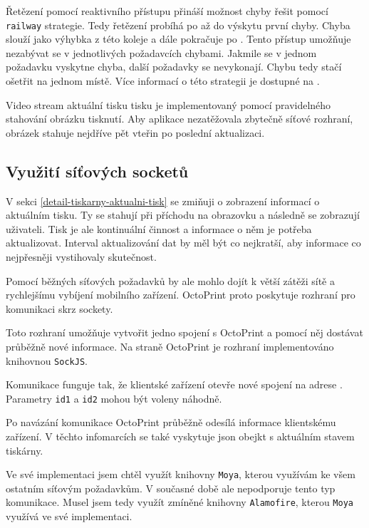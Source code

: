 
Řetězení pomocí reaktivního přístupu přináší možnost chyby řešit pomocí \texttt{railway} strategie.
Tedy řetězení probíhá po  až do výskytu první chyby.
Chyba slouží jako výhybka z této koleje a dále pokračuje po .
Tento přístup umožňuje nezabývat se v jednotlivých požadavcích chybami.
Jakmile se v jednom požadavku vyskytne chyba, další požadavky se nevykonají.
Chybu tedy stačí ošetřit na jednom místě.
Více informací o této strategii je dostupné na \cite{fsharp-railway-strategy}.

Video stream aktuální tisku tisku je implementovaný pomocí pravidelného stahování obrázku tisknutí.
Aby aplikace nezatěžovala zbytečně síťové rozhraní, obrázek stahuje nejdříve pět vteřin po poslední aktualizaci.

\subsection{Využití síťových socketů}

V sekci \ref{detail-tiskarny-aktualni-tisk} se zmiňuji o zobrazení informací o aktuálním tisku.
Ty se stahují při příchodu na obrazovku a následně se zobrazují uživateli.
Tisk je ale kontinuální činnost a informace o něm je potřeba aktualizovat.
Interval aktualizování dat by měl být co nejkratší, aby informace co nejpřesněji vystihovaly skutečnost.

Pomocí běžných síťových požadavků by ale mohlo dojít k větší zátěži sítě a rychlejšímu vybíjení mobilního zařízení.
OctoPrint proto poskytuje rozhraní pro komunikaci skrz sockety.

Toto rozhraní umožňuje vytvořit jedno spojení s OctoPrint a pomocí něj dostávat průběžně nové informace.
Na straně OctoPrint je rozhraní implementováno knihovnou \texttt{SockJS}.

Komunikace funguje tak, že klientské zařízení otevře nové spojení na adrese .
Parametry \texttt{id1} a \texttt{id2} mohou být voleny náhodně.

Po navázání komunikace OctoPrint průběžně odesílá informace klientskému zařízení.
V těchto infomarcích se také vyskytuje \acrshort{json} obejkt s aktuálním stavem tiskárny.

Ve své implementaci jsem chtěl využít knihovny \texttt{Moya}, kterou využívám ke všem ostatním síťovým požadavkům.
V současné době ale nepodporuje tento typ komunikace.
Musel jsem tedy využít zmíněné knihovny \texttt{Alamofire}, kterou \texttt{Moya} využívá ve své implementaci.

